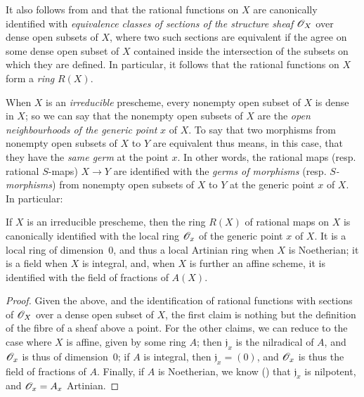 \begin{env}[7.1.3]
\label{I.7.1.3}
It also follows from  and  that the rational functions on $X$ are canonically identified with \emph{equivalence classes of sections of the structure sheaf $\mathscr{O}_X$} over dense open subsets of $X$, where two such sections are equivalent if the agree on some dense open subset of $X$ contained inside the intersection of the subsets on which they are defined.
In particular, it follows that the rational functions on $X$ form a \emph{ring} $R(X)$.
\end{env}

\begin{env}[7.1.4]
\label{I.7.1.4}
When $X$ is an \emph{irreducible} prescheme, every nonempty open subset of $X$ is dense in $X$; so we can say that the nonempty open subsets of $X$ are the \emph{open neighbourhoods of the generic point} $x$ of $X$.
To say that two morphisms from nonempty open subsets of $X$ to $Y$ are equivalent thus means, in this case, that they have the \emph{same germ} at the point $x$.
In other words, the rational maps (resp. rational $S$-maps) $X\to Y$ are identified with the \emph{germs of morphisms} (resp. \emph{$S$-morphisms}) from nonempty open subsets of $X$ to $Y$ at the generic point $x$ of $X$.
In particular:
\end{env}

\begin{proposition}[7.1.5]
\label{I.7.1.5}
If $X$ is an irreducible prescheme, then the ring $R(X)$ of rational maps on $X$ is canonically identified with the local ring $\mathscr{O}_x$ of the generic point $x$ of $X$.
It is a local ring of dimension~0, and thus a local Artinian ring when $X$ is Noetherian; it is a field when $X$ is integral, and, when $X$ is further an affine scheme, it is identified with the field of fractions of $A(X)$.
\end{proposition}

\begin{proof}
Given the above, and the identification of rational functions with sections of $\mathscr{O}_X$ over a dense open subset of $X$, the first claim is nothing but the definition of the fibre of a sheaf above a point.
For the other claims, we can reduce to the case where $X$ is affine, given by some ring $A$; then $\mathfrak{j}_x$ is the nilradical of $A$, and $\mathscr{O}_x$ is thus of dimension~0; if $A$ is integral, then $\mathfrak{j}_x=(0)$, and $\mathscr{O}_x$ is thus the field of fractions of $A$.
Finally, if $A$ is Noetherian, we know (\cite[p.~127, cor.~4]{I-11}) that $\mathfrak{j}_x$ is nilpotent, and $\mathscr{O}_x=A_x$ Artinian.
\end{proof}

